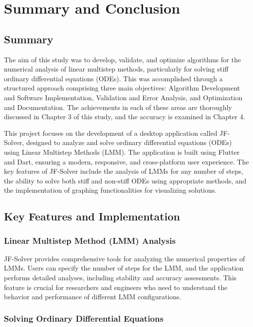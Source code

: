 
\chapter{Summary and Conclusion}

\section{Summary}
The aim of this study was to develop, validate, and optimize algorithms for the numerical analysis of linear multistep methods, particularly for solving stiff ordinary differential equations (ODEs). This was accomplished through a structured approach comprising three main objectives: Algorithm Development and Software Implementation, Validation and Error Analysis, and Optimization and Documentation. The achievements in each of these areas are thoroughly discussed in Chapter 3 of this study, and the accuracy is examined in Chapter 4.

This project focuses on the development of a desktop application called JF-Solver, designed to analyze and solve ordinary differential equations (ODEs) using Linear Multistep Methods (LMM). The application is built using Flutter and Dart, ensuring a modern, responsive, and cross-platform user experience. The key features of JF-Solver include the analysis of LMMs for any number of steps, the ability to solve both stiff and non-stiff ODEs using appropriate methods, and the implementation of graphing functionalities for visualizing solutions.

\section{Key Features and Implementation}

\subsection{Linear Multistep Method (LMM) Analysis}

JF-Solver provides comprehensive tools for analyzing the numerical properties of LMMs. Users can specify the number of steps for the LMM, and the application performs detailed analyses, including stability and accuracy assessments. This feature is crucial for researchers and engineers who need to understand the behavior and performance of different LMM configurations.

\subsection{Solving Ordinary Differential Equations}

